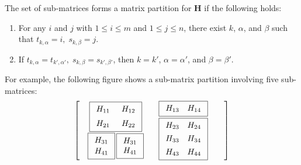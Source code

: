 \documentclass[12pt,onecolumn,draftcls]{IEEEtran}
\begin{document}
The set of sub-matrices forms a matrix partition for $\mathbf{H}$ if the following holds:
\begin{enumerate}
\item
For any $i$ and $j$ with $1\leqslant i \leqslant m$ and $ 1\leqslant j \leqslant n$, there exist $k$, $\alpha$, and $\beta$ such that
$t_{k,\alpha}=i, \; s_{k,\beta}=j$.
\item If $t_{k,\alpha}=t_{k',\alpha'}, \; s_{k,\beta}=s_{k',\beta'}$, then
$k=k'$,  $\alpha=\alpha'$, and $\beta=\beta'$.
\end{enumerate}

For example, the following figure shows a sub-matrix partition involving five sub-matrices:
\begin{equation}
\left[ 
\begin{array}{cc}
\begin{array}{c}
\fbox{$\begin{array}{cc}
        \vspace{.8mm} H_{11} \:& \:H_{12} \vspace{1.2mm}\\
        H_{21} \:& \: H_{22}
			\end{array}$} \vspace{.5mm}\\
\fbox{$\begin{array}{c}
        H_{31} \vspace{.5mm}\\
        H_{41}
			\end{array}$}\,
\fbox{$\begin{array}{c}
        H_{31} \\
        H_{41}
			\end{array}$}
\end{array}
& \hspace{-.5mm}
\begin{array}{cc}
\fbox{$\begin{array}{cc}
			H_{13} & H_{14}
			\end{array}$} & \vspace{.7mm}\\
\fbox{$\begin{array}{cc}
        H_{23} & H_{24}\vspace{1.5mm}\\ 
			H_{33} & H_{34}\vspace{1.5mm}\\
			H_{43} & H_{44}\\ 
			\end{array}$}&
\end{array}
\end{array}
\right]
\label{eq:partition}
\end{equation}
\end{document}
